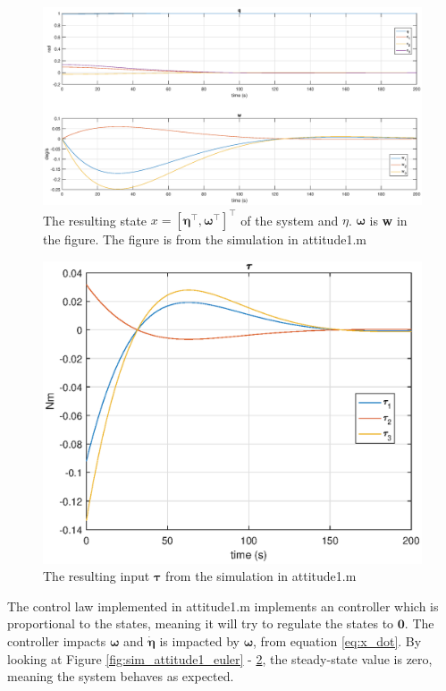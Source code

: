 \begin{figure}[htb!]
	\centering
	\includegraphics[width=1.00\textwidth]{figures/1_q.eps}
	\caption{The resulting state $x = [\boldsymbol{\eta}^\top, \boldsymbol{\omega}^\top] ^\top$ of the system and $\eta$. $\boldsymbol{\omega}$ is \textbf{w} in the figure. The figure is from the simulation in attitude1.m}
\label{fig:sim_attitude1_q}
\end{figure}

\begin{figure}[htb!]
	\centering
	\includegraphics[width=1.00\textwidth]{figures/1_tau.eps}
	\caption{The resulting input $\boldsymbol{\tau}$ from the simulation in attitude1.m}
\label{fig:sim_attitude1_tau}
\end{figure}

The control law implemented in {\color{blue} attitude1.m} implements an  controller which is proportional to the states, meaning it will try to regulate  the states to $\mathbf{0}$. The controller impacts $\boldsymbol{\omega}$ and  $\dot{\mathbf{\eta}}$ is impacted by $\boldsymbol{\omega}$, from equation \eqref{eq:x_dot}.   By looking at Figure \ref{fig:sim_attitude1_euler} - \ref{fig:sim_attitude1_tau}, the steady-state value is zero, meaning the system behaves as expected.

